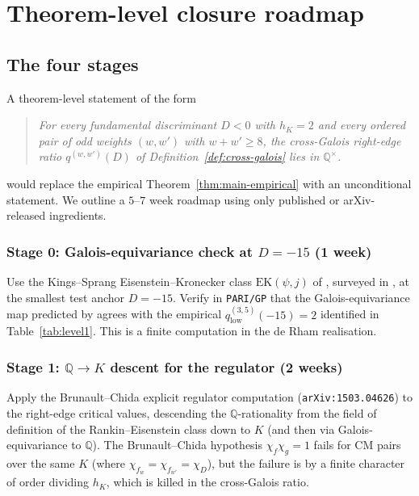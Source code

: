 \documentclass[11pt,a4paper]{amsart}
\theoremstyle{plain}
\theoremstyle{definition}
\newcommand{\Q}{\mathbb{Q}}
\newcommand{\qstr}[2]{q^{(#1,#2)}}
\begin{document}
\section{Theorem-level closure roadmap}\label{sec:roadmap}

\subsection{The four stages}\label{ss:stages}

A theorem-level statement of the form
\begin{quote}
\itshape
For every fundamental discriminant $D < 0$ with $h_K = 2$ and every ordered
pair of odd weights $(w, w')$ with $w + w' \ge 8$, the cross-Galois
right-edge ratio $\qstr{w}{w'}(D)$ of Definition~\ref{def:cross-galois}
lies in $\Q^{\times}$.
\end{quote}
would replace the empirical Theorem~\ref{thm:main-empirical} with an
unconditional statement. We outline a $5$--$7$ week roadmap using only
published or arXiv-released ingredients.

\subsubsection*{Stage 0: Galois-equivariance check at $D = -15$ (1 week)}

Use the Kings--Sprang Eisenstein--Kronecker class
$\mathrm{EK}(\psi, j)$ of \cite[\S 5]{KingsSprang2025}, surveyed in
\cite{KingsSprang2025survey}, at the smallest test anchor $D = -15$. Verify
in \texttt{PARI/GP} that the Galois-equivariance map predicted by
\cite[Thm.~2.2]{KingsSprang2025survey} agrees with the empirical
$\qstr{3}{5}_{\mathrm{low}}(-15) = 2$ identified in Table~\ref{tab:level1}.
This is a finite computation in the de Rham realisation.

\subsubsection*{Stage 1: $\Q\to K$ descent for the regulator
(2 weeks)}

Apply the Brunault--Chida explicit regulator computation
\cite[\S 4]{BrunaultChida2015} (\texttt{arXiv:1503.04626}) to the right-edge
critical values, descending the $\Q$-rationality from the field of
definition of the Rankin--Eisenstein class down to $K$ (and then via
Galois-equivariance to $\Q$). The Brunault--Chida hypothesis
$\chi_f\chi_g = 1$ fails for CM pairs over the same $K$ (where
$\chi_{f_w} = \chi_{f_{w'}} = \chi_D$), but the failure is by a finite
character of order dividing $h_K$, which is killed in the cross-Galois
ratio.
\end{document}
